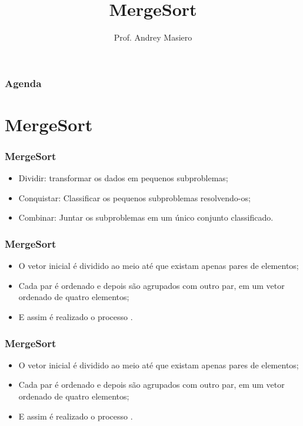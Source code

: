 \documentclass{beamer}
\begin{document}
\title[MergeSort]{MergeSort}
\author{Prof. Andrey Masiero}

\begin{frame}
  \titlepage
\end{frame}

\begin{frame}
  \frametitle{Agenda}
  \tableofcontents
\end{frame}

\section{MergeSort}

\begin{frame}
	\frametitle{MergeSort}
    \begin{itemize}[<+->]
        \item Dividir: transformar os dados em pequenos subproblemas;
        \item Conquistar: Classificar os pequenos subproblemas resolvendo-os;
        \item Combinar: Juntar os subproblemas em um único conjunto classificado.
    \end{itemize}
\end{frame}

\begin{frame}
    \frametitle{MergeSort}
    \begin{itemize}[<+->]
        \item O vetor inicial é dividido ao meio até que existam apenas pares de elementos;
        \item Cada par é ordenado e depois são agrupados com outro par, em um vetor ordenado de quatro elementos;
        \item E assim é realizado o processo .
    \end{itemize}
\end{frame}

\begin{frame}
    \frametitle{MergeSort}
    \begin{itemize}[<+->]
        \item O vetor inicial é dividido ao meio até que existam apenas pares de elementos;
        \item Cada par é ordenado e depois são agrupados com outro par, em um vetor ordenado de quatro elementos;
        \item E assim é realizado o processo .
    \end{itemize}
\end{frame}
\end{document}
